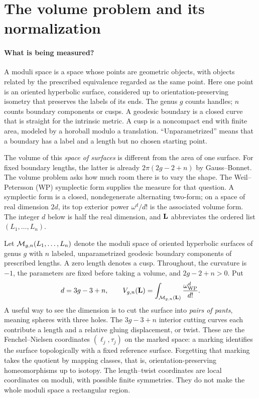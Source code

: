 \section{The volume problem and its normalization}
\label{sec:conventions}

\paragraph{What is being measured?}
A moduli space is a space whose points are geometric objects, with
objects related by the prescribed equivalence regarded as the same point.
Here one point is an oriented hyperbolic surface, considered up to
orientation-preserving isometry that preserves the labels of its ends.
The genus $g$ counts handles; $n$ counts boundary components or cusps.
A geodesic boundary is a closed curve that is straight for the intrinsic
metric. A cusp is a noncompact end with finite area, modeled by a
horoball modulo a translation. ``Unparametrized'' means that a boundary
has a label and a length but no chosen starting point.

The volume of this \emph{space of surfaces} is different from the area
of one surface. For fixed boundary lengths, the latter is already
$2\pi(2g-2+n)$ by Gauss--Bonnet. The volume problem asks how much
room there is to vary the shape. The Weil--Petersson (WP) symplectic
form supplies the measure for that question. A symplectic form is a
closed, nondegenerate alternating two-form; on a space of real
dimension $2d$, its top exterior power $\omega^d/d!$ is the associated
volume form. The integer $d$ below is half the real dimension, and
$\mathbf L$ abbreviates the ordered list $(L_1,\ldots,L_n)$.

Let $\mathcal M_{g,n}(L_1,\ldots,L_n)$ denote the moduli space of oriented hyperbolic
surfaces of genus $g$ with $n$ labeled, unparametrized geodesic boundary
components of prescribed lengths. A zero length denotes a cusp. Throughout,
the curvature is $-1$, the parameters are fixed before taking a volume, and
$2g-2+n>0$. Put
\[
 d=3g-3+n,\qquad
 V_{g,n}(\mathbf L)=\int_{\mathcal M_{g,n}(\mathbf L)}
                  \frac{\omega_{\mathrm{WP}}^{d}}{d!}.
\]
A useful way to see the dimension is to cut the surface into
\emph{pairs of pants}, meaning spheres with three holes. The
$3g-3+n$ interior cutting curves each contribute a length and a
relative gluing displacement, or twist. These are the
Fenchel--Nielsen coordinates $(\ell_j,\tau_j)$ on the marked
space: a marking identifies the surface topologically with a fixed
reference surface. Forgetting that marking takes the quotient by
mapping classes, that is, orientation-preserving homeomorphisms up
to isotopy. The length--twist coordinates are local coordinates on
moduli, with possible finite symmetries. They do not make the whole
moduli space a rectangular region.

